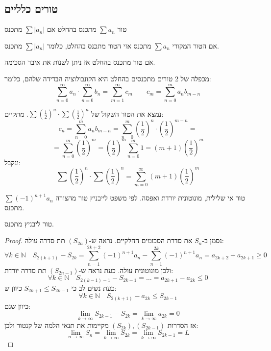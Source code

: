 \documentclass{tstextbook}
\begin{document}
\subsection{טורים כלליים}

\begin{definition}
טור \(\sum a_{n}\) מתכנס בהחלט אם \(\sum\lvert a_{n} \rvert\) מתכנס

\end{definition}
\begin{proposition}
אם הטור המקורי \(\sum a_{n}\) מתכנס אזי הטור מתכנס בהחלט, כלומר \(\sum\lvert a_{n} \rvert\) מתכנס.

\end{proposition}
\begin{proposition}
אם טור מתכנס בהחלט אז ניתן לשנות את איבר הסכימה.

\end{proposition}
\begin{proposition}
מכפלה של 2 טורים מתכנסים בהחלט היא הקונבולוציה הבדידה שלהם, כלומר:
$$\sum_{n=0}^\infty a_n \cdot \sum_{n=0}^\infty b_n = \sum_{m=1}^\infty c_m \qquad c_m = \sum_{n=0}^m a_n b_{m-n}$$

\end{proposition}
\begin{example}
נמצא את הטור השקול של \(\sum \left(\frac{1}{2}\right)^n \cdot \sum \left(\frac{1}{2}\right)^n\). מתקיים:
$$c_n = \sum_{n=0}^m a_n b_{m-n} = \sum_{n=0}^m \left(\frac{1}{2}\right)^n \cdot \left(\frac{1}{2}\right)^{m-n}=$$$$= \sum_{n=0}^m \left(\frac{1}{2}\right)^m = \left(\frac{1}{2}\right)^m \sum_{n=0}^m 1 = (m+1)\left(\frac{1}{2}\right)^m$$
ונקבל:
$$\sum \left(\frac{1}{2}\right)^n \cdot \sum \left(\frac{1}{2}\right)^n = \sum_{m=0}^\infty (m+1) \left(\frac{1}{2}\right)^m$$

\end{example}
\begin{definition}
טור אי שלילית, מונוטונית יורדת ואפסה. לפי משפט לייבניץ טור מהצורה \(\sum(-1)^{n+1} a_n\) מתכנס.

\end{definition}
\begin{proposition}
טור ליבניץ מתכנס.

\end{proposition}
\begin{proof}
נסמן ב-\(S_{n}\) את סדרת הסכומים החלקיים. נראה ש-\((S_{2n})\) תת סדרה עולה:
$$\forall k \in \mathbb{N}\quad S_{2(k+1)}-S_{2k}=\sum_{n=1}^{2k+2}(-1)^{n+1}a_{n}-\sum_{n=1}^{2k}(-1)^{n+1} a_{n}=a_{2k+2}+a_{2k+1}\geq 0$$
ולכן מונוטונית עולה. כעת נראה ש-\((S_{2n-1})\) תת סדרה יורדת:
$$\forall k \in \mathbb{N}\quad S_{2(k-1)-1}-S_{2k-1}=\dots =a_{2k+1}-a_{2k}\leq 0$$
כעת נשים לב כי \(S_{2k+1}\leq S_{2k-1}\) כיוון ש:
$$\forall k \in \mathbb{N}\quad  S_{2(k+1)}-a_{2k}\leq S_{2k-1}$$
כיוון שגם:
$$\lim_{ k \to \infty } S_{2k-1}-S_{2k}=\lim_{ k \to \infty } a_{2k}=0 $$
אז הסדרות \((S_{2k}),(S_{2k-1})\) מקיימות את תנאי הלמה של קנטור ולכן:
$$\lim_{ n \to \infty } S_{n}=\lim_{ k \to \infty } S_{2k}=\lim_{ k \to \infty } S_{2k-1}=L$$

\end{proof}
\end{document}
